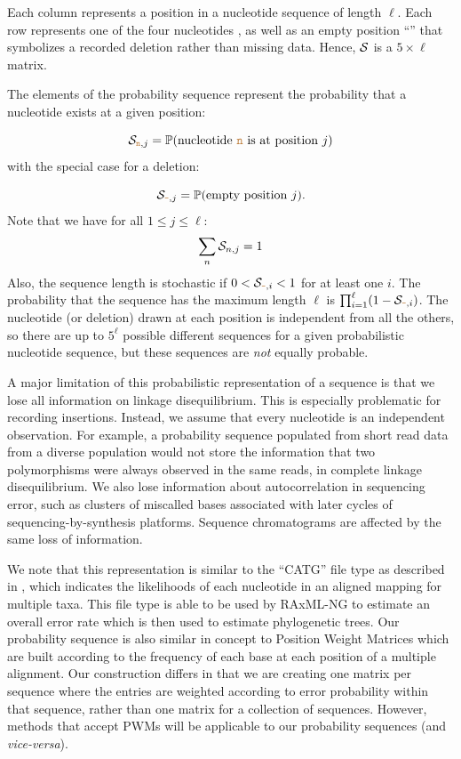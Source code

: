 \documentclass[10pt]{article}
\begin{document}
Each column represents a position in a nucleotide sequence of length $\ell$.
Each row represents one of the four nucleotides , as well as an empty position ``\sq{-}'' that symbolizes a recorded deletion rather than missing data.
Hence, $\mathcal{S}$ is a $5\times\ell$ matrix.



The elements of the probability sequence represent the probability that a nucleotide exists at a given position:

\begin{equation}
\mathcal{S}_{\texttt{\textcolor{brown}{n}},j} = \mathbb{P}(\text{nucleotide \texttt{\textcolor{brown}{n}} is at position }j)
\end{equation}
with the special case for a deletion:

\begin{equation}
\mathcal{S}_{\texttt{\textcolor{brown}{-}},j} = \mathbb{P}(\text{empty position }j).
\end{equation}
Note that we have for all $1\leq j \leq \ell$:
\begin{equation}
\sum_{n} \mathcal{S}_{n, j} = 1
\end{equation}
Also, the sequence length is stochastic if $0<\mathcal{S}_{\texttt{\textcolor{brown}{-}},i}<1$ for at least one $i$.
The probability that the sequence has the maximum length $\ell$ is $\prod_{i=1}^\ell (1-\mathcal{S}_{\texttt{\textcolor{brown}{-}},i})$.
The nucleotide (or deletion) drawn at each position is independent from all the others, so there are up to $5^\ell$ possible different sequences for a given probabilistic nucleotide sequence, but these sequences are \emph{not} equally probable.


A major limitation of this probabilistic representation of a sequence is that we lose all information on linkage disequilibrium.
This is especially problematic for recording insertions.
Instead, we assume that every nucleotide is an independent observation.
For example, a probability sequence populated from short read data from a diverse population would not store the information that two polymorphisms were always observed in the same reads, \ie in complete linkage disequilibrium.
We also lose information about autocorrelation in sequencing error, such as clusters of miscalled bases associated with later cycles of sequencing-by-synthesis platforms.
Sequence chromatograms are affected by the same loss of information.

We note that this representation is similar to the ``CATG'' file type as described in \citet{kozlovModelsOptimizationsTools2018}, which indicates the likelihoods of each nucleotide in an aligned mapping for multiple taxa. 
This file type is able to be used by RAxML-NG to estimate an overall error rate which is then used to estimate phylogenetic trees.
Our probability sequence is also similar in concept to Position Weight Matrices \citep[PWMs, ][]{stormoUsePerceptronAlgorithm1982} which are built according to the frequency of each base at each position of a multiple alignment. 
Our construction differs in that we are creating one matrix per sequence where the entries are weighted according to error probability within that sequence, rather than one matrix for a collection of sequences. 
However, methods that accept PWMs will be applicable to our probability sequences (and \emph{vice-versa}).
\end{document}
